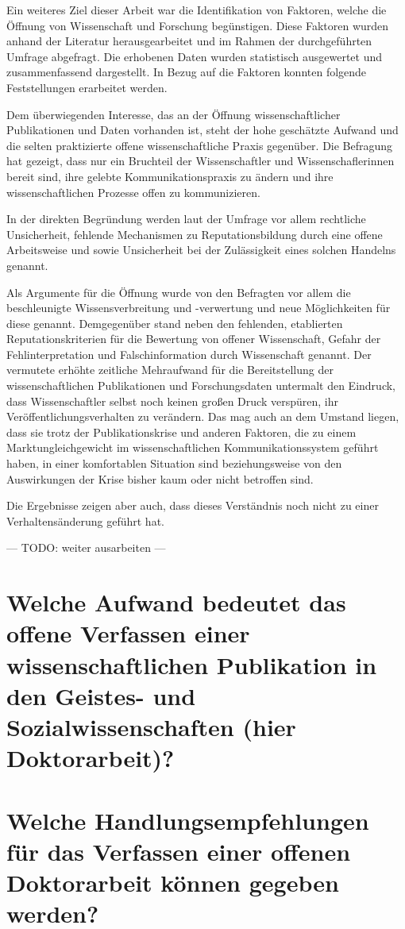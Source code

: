 Ein weiteres Ziel dieser Arbeit war die Identifikation von Faktoren, welche die Öffnung von Wissenschaft und Forschung begünstigen. Diese Faktoren wurden anhand der Literatur herausgearbeitet und im Rahmen der durchgeführten Umfrage abgefragt. Die erhobenen Daten wurden statistisch ausgewertet und zusammenfassend dargestellt. In Bezug auf die Faktoren konnten folgende Feststellungen erarbeitet werden.

Dem überwiegenden Interesse, das an der Öffnung wissenschaftlicher Publikationen und Daten vorhanden ist, steht der hohe geschätzte Aufwand und die selten praktizierte offene wissenschaftliche Praxis gegenüber. Die Befragung hat gezeigt, dass nur ein Bruchteil der Wissenschaftler und Wissenschaflerinnen bereit sind, ihre gelebte Kommunikationspraxis zu ändern und ihre wissenschaftlichen Prozesse offen zu kommunizieren.

In der direkten Begründung werden laut der Umfrage vor allem rechtliche Unsicherheit, fehlende Mechanismen zu Reputationsbildung durch eine offene Arbeitsweise und sowie Unsicherheit bei der Zulässigkeit eines solchen Handelns genannt.

Als Argumente für die Öffnung wurde von den Befragten vor allem die beschleunigte Wissensverbreitung und -verwertung und neue Möglichkeiten für diese genannt. Demgegenüber stand neben den fehlenden, etablierten Reputationskriterien für die Bewertung von offener Wissenschaft, Gefahr der Fehlinterpretation und Falschinformation durch Wissenschaft genannt. Der vermutete erhöhte zeitliche Mehraufwand für die Bereitstellung der wissenschaftlichen Publikationen und Forschungsdaten untermalt den Eindruck, dass Wissenschaftler selbst noch keinen großen Druck verspüren, ihr Veröffentlichungsverhalten zu verändern. Das mag auch an dem Umstand liegen, dass sie trotz der Publikationskrise und anderen Faktoren, die zu einem Marktungleichgewicht im wissenschaftlichen Kommunikationssystem geführt haben, in einer komfortablen Situation sind beziehungsweise von den Auswirkungen der Krise bisher kaum oder nicht betroffen sind.

Die Ergebnisse zeigen aber auch, dass dieses Verständnis noch nicht zu einer Verhaltensänderung geführt hat.

--- TODO: weiter ausarbeiten ---

\section{Welche Aufwand bedeutet das offene Verfassen einer wissenschaftlichen Publikation in den Geistes- und Sozialwissenschaften (hier Doktorarbeit)?}


\section{Welche Handlungsempfehlungen für das Verfassen einer offenen Doktorarbeit können gegeben werden?}
